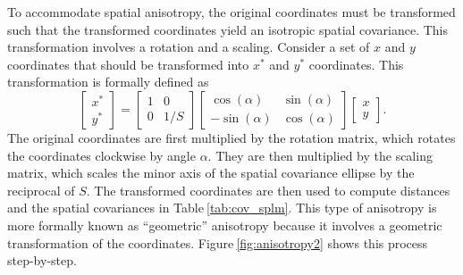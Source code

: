 \documentclass[10pt,letterpaper]{article}
\begin{document}
To accommodate spatial anisotropy, the original coordinates must be
transformed such that the transformed coordinates yield an isotropic
spatial covariance. This transformation involves a rotation and a
scaling. Consider a set of \(x\) and \(y\) coordinates that should be
transformed into \(x^*\) and \(y^*\) coordinates. This transformation is
formally defined as \begin{equation*}
  \begin{bmatrix}
    x^* \\
    y^*
  \end{bmatrix} = 
  \begin{bmatrix}
    1 & 0 \\
    0 & 1 / S
  \end{bmatrix}
  \begin{bmatrix}
    \cos(\alpha) & \sin(\alpha) \\
    -\sin(\alpha) & \cos(\alpha)
  \end{bmatrix}  
  \begin{bmatrix}
    x \\
    y
  \end{bmatrix}.
\end{equation*} The original coordinates are first multiplied by the
rotation matrix, which rotates the coordinates clockwise by angle
\(\alpha\). They are then multiplied by the scaling matrix, which scales
the minor axis of the spatial covariance ellipse by the reciprocal of
\(S\). The transformed coordinates are then used to compute distances
and the spatial covariances in Table\(~\)\ref{tab:cov_splm}. This type
of anisotropy is more formally known as ``geometric'' anisotropy because
it involves a geometric transformation of the coordinates.
Figure\(~\)\ref{fig:anisotropy2} shows this process step-by-step.
\end{document}
